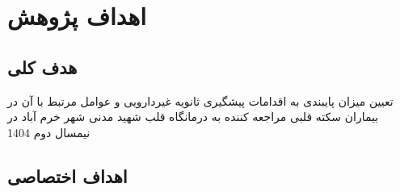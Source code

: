 \section{اهداف پژوهش}
\label{sec:objectives}

\subsection{هدف کلی}


تعیین میزان پایبندی به اقدامات پیشگیری ثانویه غیردارویی و عوامل مرتبط با آن در بیماران سکته قلبی مراجعه کننده به درمانگاه قلب شهید مدنی شهر خرم آباد در نیمسال دوم 1404


\subsection{اهداف اختصاصی}
